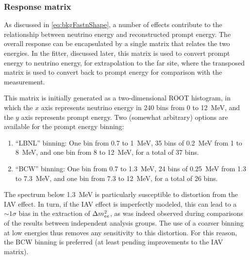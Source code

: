 \documentclass[../thesis.tex]{subfiles}
\begin{document}
\subsubsection{Response matrix}

As discussed in \autoref{eq:bkgFastnShape}, a number of effects contribute to the relationship between neutrino energy and reconstructed prompt energy. The overall response can be encapsulated by a single matrix that relates the two energies. In the fitter, discussed later, this matrix is used to convert prompt energy to neutrino energy, for extrapolation to the far site, where the transposed matrix is used to convert back to prompt energy for comparison with the measurement.

This matrix is initially generated as a two-dimensional ROOT histogram, in which the $x$ axis represents neutrino energy in 240 bins from 0 to 12~MeV, and the $y$ axis represents prompt energy. Two (somewhat arbitrary) options are available for the prompt energy binning:

\begin{enumerate}
\item ``LBNL'' binning: One bin from 0.7 to 1~MeV, 35 bins of 0.2~MeV from 1 to 8~MeV, and one bin from 8 to 12~MeV, for a total of 37 bins.
\item ``BCW'' binning: One bin from 0.7 to 1.3~MeV, 24 bins of 0.25~MeV from 1.3 to 7.3~MeV, and one bin from 7.3 to 12~MeV, for a total of 26 bins.
\end{enumerate}

The spectrum below 1.3~MeV is particularly susceptible to distortion from the IAV effect. In turn, if the IAV effect is imperfectly modeled, this can lead to a $\sim1\sigma$ bias in the extraction of $\Delta m^2_{ee}$, as was indeed observed during comparisons of the results between independent analysis groups. The use of a coarser binning at low energies thus removes any sensitivity to this distortion. For this reason, the BCW binning is preferred (at least pending improvements to the IAV matrix).

\begin{comment}
  I don't see any reason to mention the fact that a finer binning (2880 instead of 240) is used internally by the toy MC when generating this matrix. With the standard 240 bins, the edges line up with both the LBNL and BCW edges, so there shouldn't be any benefit from using a finer binning.

  deleted: Internally, the toy MC normally represents both neutrino and prompt energy using 240 bins (of 50~keV) from 0 to 12~MeV.
\end{comment}
\end{document}
